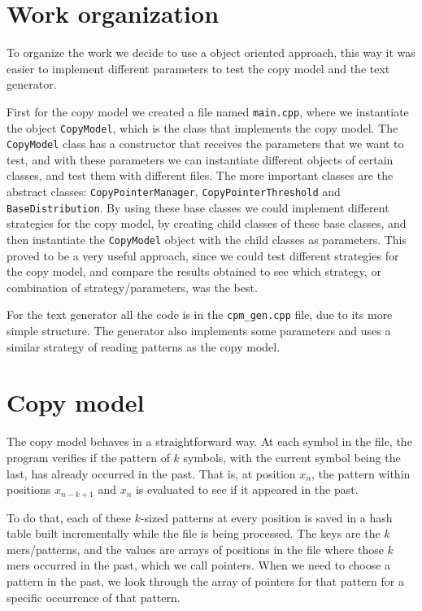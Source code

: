 \documentclass{article}
\begin{document}
\section{Work organization}
\label{sec:work-organization}

To organize the work we decide to use a object oriented approach, this way it was easier to implement different parameters to test the copy model and the text generator.

First for the copy model we created a file named \verb|main.cpp|, where we instantiate the object \verb|CopyModel|, which is the class that implements the copy model.
The \verb|CopyModel| class has a constructor that receives the parameters that we want to test, and with these parameters we can instantiate different objects of certain classes, and test them with different files.
The more important classes are the abstract classes: \verb|CopyPointerManager|, \verb|CopyPointerThreshold| and \verb|BaseDistribution|. By using these base classes we could implement different strategies for the copy model, by creating child classes of these base classes, and then instantiate the \verb|CopyModel| object with the child classes as parameters.
This proved to be a very useful approach, since we could test different strategies for the copy model, and compare the results obtained to see which strategy, or combination of strategy/parameters, was the best.

For the text generator all the code is in the \verb|cpm_gen.cpp| file, due to its more simple structure. The generator also implements some parameters and uses a similar strategy of reading patterns as the copy model.

\section{Copy model}
\label{sec:copy-model}

The copy model behaves in a straightforward way.
At each symbol in the file, the program verifies if the pattern of $k$ symbols, with the current symbol being the last, has already occurred in the past.
That is, at position $x_n$, the pattern within positions $x_{n-k+1}$ and $x_n$ is evaluated to see if it appeared in the past.

To do that, each of these $k$-sized patterns at every position is saved in a hash table built incrementally while the file is being processed.
The keys are the $k$mers/patterns, and the values are arrays of positions in the file where those $k$mers occurred in the past, which we call pointers.
When we need to choose a pattern in the past, we look through the array of pointers for that pattern for a specific occurrence of that pattern.
\end{document}
